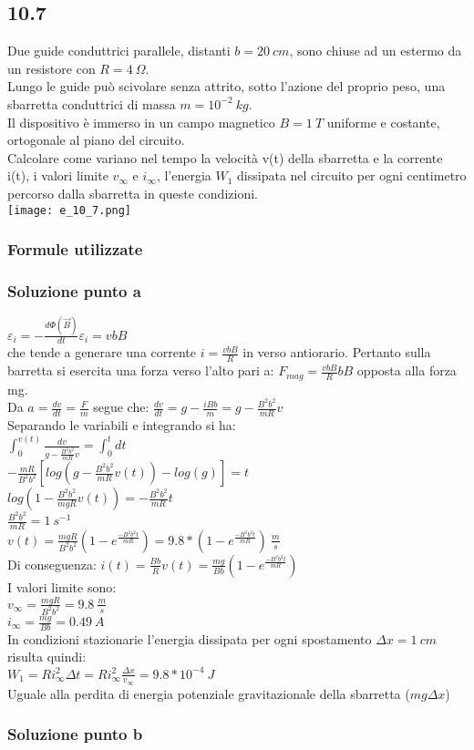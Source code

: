 \documentclass[../../main.tex]{subfiles}
\begin{document}
\subsection*{10.7}
Due guide conduttrici parallele, distanti $b = 20\ cm$, sono chiuse ad un estermo da un resistore con $R =4\ \Omega$.\\
Lungo le guide può scivolare senza attrito, sotto l'azione del proprio peso, una sbarretta conduttrici di massa $m = 10^{-2}\ kg$.\\
Il dispositivo è immerso in un campo magnetico $B=1\ T$ uniforme e costante, ortogonale al piano del circuito.\\
Calcolare come variano nel tempo la velocità v(t) della sbarretta e la corrente i(t), i valori limite $v_\infty$ e $i_\infty$, l'energia $W_1$ dissipata nel circuito per ogni centimetro percorso dalla sbarretta in queste condizioni.\\
\texttt{[image: e\_10\_7.png]}
\subsubsection*{Formule utilizzate}
\subsubsection*{Soluzione punto a}
$\varepsilon_i = -\frac{d\Phi(\vec{B})}{dt}$\tab\tab$\varepsilon_i = vbB$\\
che tende a generare una corrente $ i = \frac{vbB}{R}$ in verso antiorario. Pertanto sulla barretta si esercita una forza verso l'alto pari a: $F_{mag} = \frac{vbB}{R}bB$ opposta alla forza mg.\\
Da $a = \frac{dv}{dt} = \frac{F}{m}$ segue che: $\frac{dv}{dt} = g- \frac{iBb}{m} = g-\frac{B^2b^2}{mR}v$\\
Separando le variabili e integrando si ha:\\
$\int_0^{v(t)}\frac{dv}{g-\frac{B^2b^2}{mR}v}=\int_0^tdt$\\
$-\frac{mR}{B^2b^2}\left[log\left(g-\frac{B^2b^2}{mR}v(t)\right)-log(g)\right] = t$\\
$log\left(1-\frac{B^2b^2}{mgR}v(t)\right) = -\frac{B^2b^2}{mR}t$\\
$\frac{B^2b^2}{mR} = 1\ s^{-1}$\\
$v(t) = \frac{mgR}{B^2b^2}\left(1-e^{\frac{-B^2b^2t}{mR}}\right) = 9.8 * \left(1-e^{\frac{-B^2b^2t}{mR}}\right)\ \frac{m}{s}$\\
Di conseguenza: $i(t) = \frac{Bb}{R}v(t) = \frac{mg}{Bb}\left(1-e^{\frac{-B^2b^2t}{mR}}\right)$\\
I valori limite sono:\\
$v_\infty = \frac{mgR}{B^2b^2} = 9.8\ \frac{m}{s}$\\
$i_\infty = \frac{mg}{Bb} = 0.49\ A$\\
In condizioni stazionarie l'energia dissipata per ogni spostamento $\Delta x = 1\ cm$ risulta quindi:\\
$W_1 = Ri^2_\infty\Delta t =Ri^2_\infty\frac{\Delta x}{v_\infty} = 9.8 * 10^{-4}\ J$\\
Uguale alla perdita di energia potenziale gravitazionale della sbarretta ($mg \Delta x$)
\subsubsection*{Soluzione punto b}
\newpage
\end{document}
